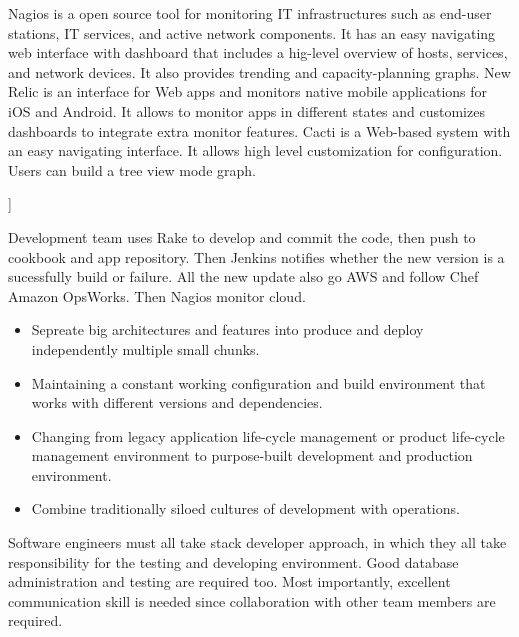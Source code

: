 \documentclass[12pt,letterpaper,boxed]{hmcpset}
\begin{document}
\begin{problem}
\end{problem}
Nagios is a open source tool for monitoring IT infrastructures such as end-user stations, IT services, and active network components. It has an easy navigating web interface with dashboard that includes a hig-level overview of hosts, services, and network devices. It also provides trending and capacity-planning graphs.\newline
New Relic is an interface for Web apps and monitors native mobile applications for iOS and Android. It allows to monitor apps in different states and customizes dashboards to integrate extra monitor features. \newline
Cacti is a  Web-based system with an easy navigating interface. It allows high level customization for configuration. Users can build a tree view mode graph.


\begin{problem}[8. Explain a typical DevOps workflow if your application uses AWS tools. [Hint: Figure 2]]
\end{problem}
Development team uses Rake to develop and commit the code, then push to cookbook and app repository. Then Jenkins notifies whether the new version is a sucessfully build or failure. All the new update also go AWS and follow Chef Amazon OpsWorks. Then Nagios monitor cloud. 


\begin{problem}
\end{problem}
\begin{itemize}
\item Sepreate big architectures and features into produce and deploy independently multiple small chunks.
\item Maintaining a constant working configuration and build environment that works with different versions and dependencies.
\item Changing from legacy application life-cycle management or product life-cycle management environment to purpose-built development and production environment.
\item Combine traditionally siloed cultures of development with operations.
\end{itemize}


\begin{problem}
\end{problem}
Software engineers must all take stack developer approach, in which they all take responsibility for the testing and developing environment. Good database administration and testing are required too. Most importantly, excellent communication skill is needed since collaboration with other team members are required.
\end{document}
